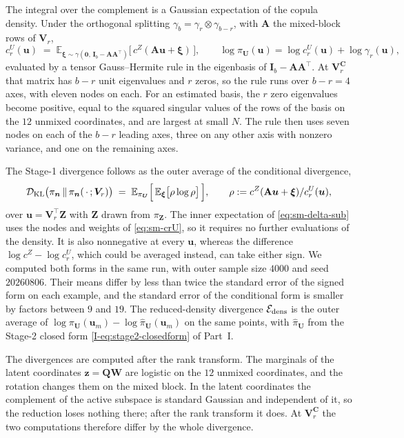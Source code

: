 \documentclass[supplement,review,hidelinks,onefignum,onetabnum]{siamart251216}
\newcommand{\EE}{\mathbb{E}}
\newcommand{\DKL}{\mathcal{D}_{\mathrm{KL}}}
\newcommand{\gauss}{\gamma}
\newcommand{\mC}{\bm{C}}
\newcommand{\mV}{\bm{V}}
\newcommand{\mI}{\bm{I}}
\newcommand{\mQ}{\bm{Q}}
\newcommand{\vzero}{\bm{0}}
\newcommand{\vn}{\bm{n}}
\newcommand{\vz}{\bm{z}}
\newcommand{\vZ}{\bm{Z}}
\newcommand{\vu}{\bm{u}}
\newcommand{\vU}{\bm{U}}
\newcommand{\vW}{\bm{W}}
\begin{document}
The integral over the complement is a Gaussian expectation of the copula density. Under the orthogonal splitting $\gauss_b = \gauss_r\otimes\gauss_{b-r}$, with $\mathbf A$ the mixed-block rows of $\mV_r$,
\begin{equation}
  c_r^{U}(\vu) \;=\; \EE_{\bm\xi \sim \gauss(\vzero,\, \mI_b - \mathbf A\mathbf A^\top)}\bigl[\,c^{Z}(\mathbf A\vu + \bm\xi)\,\bigr],
  \qquad
  \log\pi_{\vU}(\vu) = \log c_r^{U}(\vu) + \log\gauss_r(\vu),
  \label{eq:sm-crU}
\end{equation}
evaluated by a tensor Gauss--Hermite rule \cite{GolubWelsch1969} in the eigenbasis of $\mI_b - \mathbf A\mathbf A^\top$. At $\mV_r^{\mC}$ that matrix has $b-r$ unit eigenvalues and $r$ zeros, so the rule runs over $b - r = 4$ axes, with eleven nodes on each. For an estimated basis, the $r$ zero eigenvalues become positive, equal to the squared singular values of the rows of the basis on the $12$ unmixed coordinates, and are largest at small $N$. The rule then uses seven nodes on each of the $b-r$ leading axes, three on any other axis with nonzero variance, and one on the remaining axes.

The Stage-1 divergence follows as the outer average of the conditional divergence,
\begin{equation}
  \DKL\bigl(\pi_{\vn}\,\|\,\pi_{\vn}(\,\cdot\,;\mV_r)\bigr)
  \;=\;
  \EE_{\pi_{\vU}}\Bigl[\,\EE_{\bm\xi}\bigl[\rho\log\rho\bigr]\,\Bigr],
  \qquad \rho := c^{Z}(\mathbf A\vu+\bm\xi)/c_r^{U}(\vu),
  \label{eq:sm-delta-sub}
\end{equation}
over $\vu = \mV_r^\top\vZ$ with $\vZ$ drawn from $\pi_{\vZ}$.
The inner expectation of \eqref{eq:sm-delta-sub} uses the nodes and weights of \eqref{eq:sm-crU}, so it requires no further evaluations of the density. It is also nonnegative at every $\vu$, whereas the difference $\log c^{Z} - \log c_r^{U}$, which could be averaged instead, can take either sign. We computed both forms in the same run, with outer sample size $4000$ and seed $20260806$. Their means differ by less than twice the standard error of the signed form on each example, and the standard error of the conditional form is smaller by factors between $9$ and $19$. The reduced-density divergence $\mathcal E_{\rm dens}$ is the outer average of $\log\pi_{\vU}(\vu_m) - \log\widehat\pi_{\vU}(\vu_m)$ on the same points, with $\widehat\pi_{\vU}$ from the Stage-2 closed form \eqref{I-eq:stage2-closedform} of Part~I.

The divergences are computed after the rank transform. The marginals of the latent coordinates $\vz = \mQ\vW$ are logistic on the $12$ unmixed coordinates, and the rotation changes them on the mixed block. In the latent coordinates the complement of the active subspace is standard Gaussian and independent of it, so the reduction loses nothing there; after the rank transform it does. At $\mV_r^{\mC}$ the two computations therefore differ by the whole divergence.
\end{document}
